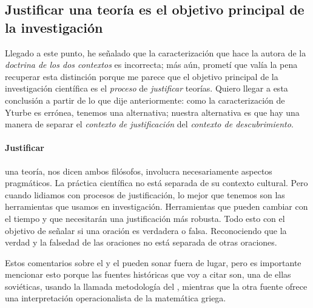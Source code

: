 \subsection{Justificar una teoría es el objetivo principal de la investigación}

Llegado a este punto, he señalado que la caracterización que hace la autora de la \emph{doctrina de los dos contextos} es incorrecta; 
más aún, prometí que valía la pena recuperar esta distinción porque me parece que el objetivo principal de la investigación 
científica es el \emph{proceso} de \emph{justificar} teorías.
Quiero llegar a esta conclusión a partir de lo que dije anteriormente: como la caracterización de Yturbe es errónea, tenemos una alternativa; 
nuestra alternativa es que hay una manera de separar el \emph{contexto de justificación} del \emph{contexto de descubrimiento}.




\paragraph{Justificar} una teoría, nos dicen ambos filósofos, involucra necesariamente aspectos pragmáticos.
La práctica científica no está separada de su contexto cultural.
Pero cuando lidiamos con procesos de justificación, lo mejor que tenemos son las herramientas que usamos en investigación.
Herramientas que pueden cambiar con el tiempo y que necesitarán una justificación más robusta.
Todo esto con el objetivo de señalar si una oración es verdadera o falsa.
Reconociendo que la verdad y la falsedad de las oraciones no está separada de otras oraciones.

Estos comentarios sobre el  y el  pueden sonar fuera de lugar,
pero es importante mencionar esto porque las fuentes históricas que voy a citar son, una de ellas soviéticas, usando la llamada metodología del , mientras que la otra fuente ofrece una interpretación operacionalista de la matemática griega.




